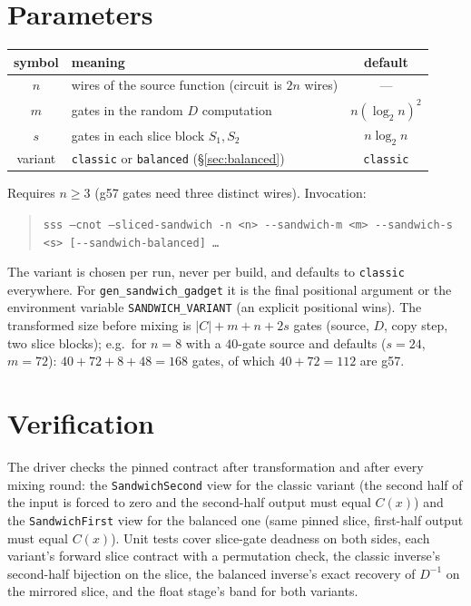 \documentclass[11pt]{article}
\newcommand{\code}[1]{\texttt{#1}}
\begin{document}
\section{Parameters}

\begin{center}
\renewcommand{\arraystretch}{1.2}
\begin{tabular}{clc}
\toprule
symbol & meaning & default \\
\midrule
$n$ & wires of the source function (circuit is $2n$ wires) & --- \\
$m$ & gates in the random $D$ computation & $n(\log_2 n)^2$ \\
$s$ & gates in each slice block $S_1, S_2$ & $n\log_2 n$ \\
variant & \code{classic} or \code{balanced} (\S\ref{sec:balanced}) & \code{classic} \\
\bottomrule
\end{tabular}
\end{center}

\noindent Requires $n \ge 3$ (g57 gates need three distinct wires). Invocation:
\begin{quote}
\code{sss --cnot --sliced-sandwich -n <n> {-}{-}sandwich-m <m> {-}{-}sandwich-s <s>
[{-}{-}sandwich-balanced] \dots}
\end{quote}
\noindent The variant is chosen per run, never per build, and defaults to
\code{classic} everywhere. For \code{gen\_sandwich\_gadget} it is the final
positional argument or the environment variable \code{SANDWICH\_VARIANT}
(an explicit positional wins).
The transformed size before mixing is
$\lvert C\rvert + m + n + 2s$ gates
(source, $D$, copy step, two slice blocks); e.g.\ for $n=8$ with a $40$-gate
source and defaults ($s=24$, $m=72$): $40+72+8+48 = 168$ gates, of which
$40+72=112$ are g57.

\section{Verification}

The driver checks the pinned contract after transformation and after every
mixing round: the \code{SandwichSecond} view for the classic variant (the
second half of the input is forced to zero and the second-half output must
equal $C(x)$) and the \code{SandwichFirst} view for the balanced one (same
pinned slice, first-half output must equal $C(x)$). Unit tests cover
slice-gate deadness on both sides, each variant's forward slice contract with
a permutation check, the classic inverse's second-half bijection on the slice,
the balanced inverse's exact recovery of $D^{-1}$ on the mirrored slice, and
the float stage's band for both variants.
\end{document}
